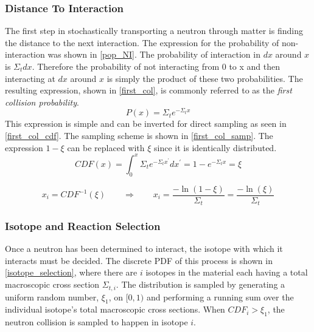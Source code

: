 \subsubsection{Distance To Interaction}

The first step in stochastically transporting a neutron through matter is finding the distance to the next interaction.  The expression for the probability of non-interaction was shown in \eqref{pop_NI}.  The probability of interaction in $dx$ around $x$ is $\Sigma_t dx$.  Therefore the probability of not interacting from 0 to x and then interacting at $dx$ around $x$ is simply the product of these two probabilities.  The resulting expression, shown in \eqref{first_col}, is commonly referred to as the \emph{first collision probability}.
%
\begin{equation}
\label{first_col}
P(x) = \Sigma_t e^{- \Sigma_t  x}
\end{equation}
%
This expression is simple and can be inverted for direct sampling as seen in \eqref{first_col_cdf}.  The sampling scheme is shown in \eqref{first_col_samp}.  The expression $1-\xi$ can be replaced with $\xi$ since it is identically distributed.
%
\begin{equation}
\label{first_col_cdf}
CDF(x) = \int_0^x \Sigma_t e^{- \Sigma_t  x^\prime} dx^\prime = 1- e^{- \Sigma_t  x} = \xi
\end{equation}

\begin{equation}
\label{first_col_samp}
x_i=CDF^{-1}(\xi) \qquad \Rightarrow \qquad x_i=\frac{-\ln(1-\xi) }{\Sigma_t}=\frac{-\ln(\xi) }{\Sigma_t}
\end{equation}


\subsubsection{Isotope and Reaction Selection}

Once a neutron has been determined to interact, the isotope with which it interacts must be decided.  The discrete PDF of this process is shown in \eqref{isotope_selection}, where there are $i$ isotopes in the material each having a total macroscopic cross section $\Sigma_{t,i}$.  The distribution is sampled by generating a uniform random number, $\xi_1$, on $[0,1)$ and performing a running sum over the individual isotope's total macroscopic cross sections.  When $CDF_i > \xi_1$, the neutron collision is sampled to happen in isotope $i$.

